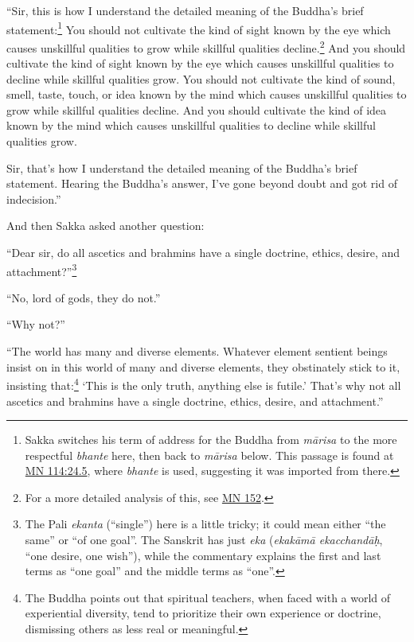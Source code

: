 \documentclass[12pt,openany]{book}%
\begin{document}
“Sir, this is how I understand the detailed meaning of the Buddha’s brief statement:\footnote{Sakka switches his term of address for the Buddha from \textit{\textsanskrit{mārisa}} to the more respectful \textit{bhante} here, then back to \textit{\textsanskrit{mārisa}} below. This passage is found at \href{https://suttacentral.net/mn114/en/sujato\#24.5}{MN 114:24.5}, where \textit{bhante} is used, suggesting it was imported from there. } You should not cultivate the kind of sight known by the eye which causes unskillful qualities to grow while skillful qualities decline.\footnote{For a more detailed analysis of this, see \href{https://suttacentral.net/mn152/en/sujato}{MN 152}. } And you should cultivate the kind of sight known by the eye which causes unskillful qualities to decline while skillful qualities grow. You should not cultivate the kind of sound, smell, taste, touch, or idea known by the mind which causes unskillful qualities to grow while skillful qualities decline. And you should cultivate the kind of idea known by the mind which causes unskillful qualities to decline while skillful qualities grow. 

Sir, that’s how I understand the detailed meaning of the Buddha’s brief statement. Hearing the Buddha’s answer, I’ve gone beyond doubt and got rid of indecision.” 

And then Sakka asked another question: 

“Dear sir, do all ascetics and brahmins have a single doctrine, ethics, desire, and attachment?”\footnote{The Pali \textit{ekanta} (“single”) here is a little tricky; it could mean either “the same” or “of one goal”. The Sanskrit has just \textit{eka} (\textit{\textsanskrit{ekakāmā} \textsanskrit{ekacchandāḥ}}, “one desire, one wish”), while the commentary explains the first and last terms as “one goal” and the middle terms as “one”. } 

“No, lord of gods, they do not.” 

“Why not?” 

“The world has many and diverse elements. Whatever element sentient beings insist on in this world of many and diverse elements, they obstinately stick to it, insisting that:\footnote{The Buddha points out that spiritual teachers, when faced with a world of experiential diversity, tend to prioritize their own experience or doctrine, dismissing others as less real or meaningful. } ‘This is the only truth, anything else is futile.’ That’s why not all ascetics and brahmins have a single doctrine, ethics, desire, and attachment.” 
\end{document}
